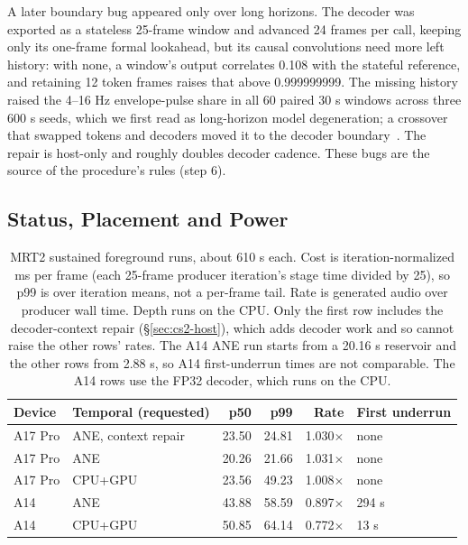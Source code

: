 \documentclass[11pt]{article}
\begin{document}
A later boundary bug appeared only over long horizons. The decoder was exported as a stateless 25-frame window and advanced 24 frames per call, keeping only its one-frame formal lookahead, but its causal convolutions need more left history: with none, a window's output correlates 0.108 with the stateful reference, and retaining 12 token frames raises that above 0.999999999. The missing history raised the 4--16 Hz envelope-pulse share in all 60 paired 30 s windows across three 600 s seeds, which we first read as long-horizon model degeneration; a crossover that swapped tokens and decoders moved it to the decoder boundary~\citep{mrt2-three-clocks}. The repair is host-only and roughly doubles decoder cadence. These bugs are the source of the procedure's rules (step 6).

\subsection{Status, Placement and Power}\label{sec:cs2-power}

\begin{table}[h]
\centering
\small
\caption{MRT2 sustained foreground runs, about 610 s each. Cost is iteration-normalized ms per frame (each 25-frame producer iteration's stage time divided by 25), so p99 is over iteration means, not a per-frame tail. Rate is generated audio over producer wall time. Depth runs on the CPU. Only the first row includes the decoder-context repair (\S\ref{sec:cs2-host}), which adds decoder work and so cannot raise the other rows' rates. The A14 ANE run starts from a 20.16 s reservoir and the other rows from 2.88 s, so A14 first-underrun times are not comparable. The A14 rows use the FP32 decoder, which runs on the CPU.}
\label{tab:cs2-sustain}
\begin{tabular}{@{}llrrrl@{}}
\toprule
Device & Temporal (requested) & p50 & p99 & Rate & First underrun \\
\midrule
A17 Pro & ANE, context repair & 23.50 & 24.81 & 1.030$\times$ & none \\
A17 Pro & ANE                 & 20.26 & 21.66 & 1.031$\times$ & none \\
A17 Pro & CPU+GPU             & 23.56 & 49.23 & 1.008$\times$ & none \\
A14     & ANE                 & 43.88 & 58.59 & 0.897$\times$ & 294 s \\
A14     & CPU+GPU             & 50.85 & 64.14 & 0.772$\times$ & 13 s \\
\bottomrule
\end{tabular}
\end{table}
\end{document}

